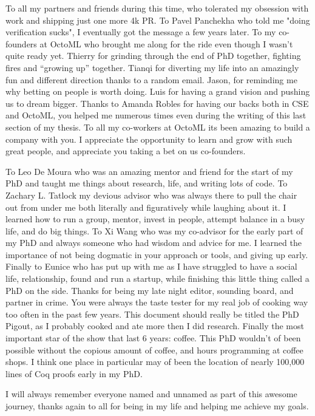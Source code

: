 To all my partners and friends during this time, who tolerated
    my obsession with work and shipping just one more 4k PR.
To Pavel Panchekha who told me "doing verification sucks",
    I eventually got the message a few years later.
To my co-founders at OctoML who brought me along for the ride
    even though I wasn't quite ready yet.
Thierry for grinding through the end of PhD together,
    fighting fires and ``growing up'' together.
Tianqi for diverting my life into an amazingly fun and
    different direction thanks to a random email.
Jason, for reminding me why betting on people is worth doing.
Luis for having a grand vision and pushing us to dream
    bigger.
Thanks to Amanda Robles for having our backs both in CSE
    and OctoML, you helped me numerous times even during
    the writing of this last section of my thesis.
To all my co-workers at OctoML its been amazing to build
    a company with you.
I appreciate the opportunity to learn and grow with such
    great people, and appreciate you taking a bet on us
    co-founders.

To Leo De Moura who was an amazing mentor and friend for the start of
    my PhD and taught me things about research, life, and writing lots of code.
To Zachary L. Tatlock my devious advisor who was always there
    to pull the chair out from under me both literally and figuratively
    while laughing about it.
I learned how to run a group, mentor, invest in people, attempt
    balance in a busy life, and do big things.
To Xi Wang who was my co-advisor for the early part of my PhD
    and always someone who had wisdom and advice for me.
I learned the importance of not being dogmatic in your approach or tools,
    and giving up early.
Finally to Eunice who has put up with me as I have struggled
    to have a social life, relationship, found and run a startup,
    while finishing this little thing called a PhD on the side.
Thanks for being my late night editor, sounding board, and
    partner in crime.
You were always the taste tester for my real job
    of cooking way too often in the past few years.
This document should really be titled the PhD Pigout, as I probably cooked
    and ate more then I did research.
Finally the most important star of the show that last 6 years: coffee.
This PhD wouldn't of been possible without the copious amount of coffee,
    and hours programming at coffee shops.
I think one place in particular may of been the location of nearly 100,000
    lines of Coq proofs early in my PhD.

I will always remember everyone named and unnamed as part of this awesome journey,
    thanks again to all for being in my life and helping me achieve my goals.
